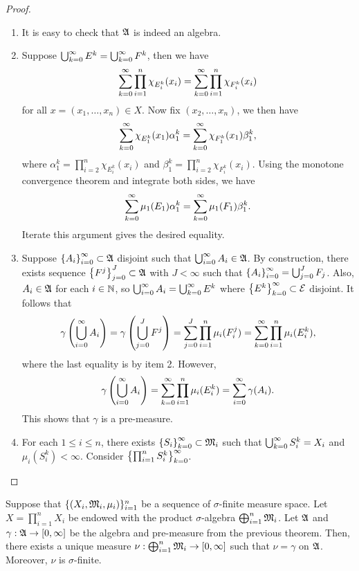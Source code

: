 \documentclass[a4paper]{article}
\begin{document}
\begin{proof}
\begin{enumerate}
\item It is easy to check that $\mathfrak{A}$ is indeed an algebra.
\item Suppose $\bigcup_{k=0}^\infty E^k = \bigcup_{k=0}^\infty F^k$, then we have 
\[
\sum_{k=0}^\infty \prod_{i=1}^n \chi_{E_i^k}(x_i) 
= \sum_{k=0}^\infty \prod_{i=1}^n \chi_{F_i^k}(x_i)
\]
for all $x = (x_1, \dots, x_n) \in X$. 
Now fix $(x_2, \dots, x_n)$, we then have 
\[
\sum_{k=0}^\infty \chi_{E^k_1}(x_1) \alpha_1^k 
= \sum_{k=0}^\infty \chi_{F^k_1}(x_1) \beta_1^k, 
\]
where 
$\alpha_1^k = \prod_{i=2}^n \chi_{E_i^k} (x_i)$ and 
$\beta_1^k = \prod_{i=2}^n \chi_{F_i^k} (x_i)$.
Using the monotone convergence theorem and integrate 
both sides, we have 
\[
\sum_{k=0}^\infty \mu_1(E_1) \alpha_1^k 
= \sum_{k=0}^\infty \mu_1(F_1) \beta_1^k.
\]
Iterate this argument gives the desired equality.

\item Suppose $\left\{ A_i \right\}_{i=0}^\infty \subset \mathfrak{A}$ disjoint such that 
$\bigcup_{i=0}^\infty A_i \in \mathfrak{A}$. By construction, there exists 
sequence $\left\{ F^j \right\}_{j=0}^J \subset \mathfrak{A}$ with $J < \infty$ such that 
$\left\{ A_i \right\}_{i=0}^\infty = \bigcup_{j=0}^J F_j$. Also, $A_i \in \mathfrak{A}$ 
for each $i \in \mathbb{N}$, so $\bigcup_{i=0}^\infty A_i = \bigcup_{k=0}^\infty E^k$
where $\left\{ E^k \right\}_{k=0}^\infty \subset \mathcal{E}$ disjoint.
It follows that 
\[
\gamma \left( \bigcup_{i=0}^\infty A_i \right)
= \gamma \left( \bigcup_{j=0}^J F^j \right)
= \sum_{j=0}^J \prod_{i=1}^n \mu_i ( F_i^j )
= \sum_{k=0}^\infty \prod_{i=1}^n \mu_i (E_i^k),
\]
where the last equality is by item 2. However, 
\[
\gamma \left( \bigcup_{i=0}^\infty A_i \right) 
= \sum_{k=0}^\infty \prod_{i=1}^n \mu_i (E_i^k) 
= \sum_{i=0}^\infty \gamma (A_i).
\]
This shows that $\gamma$ is a pre-measure.

\item For each $1 \leq i \leq n$, there exists 
$\left\{ S_i \right\}_{k=0}^\infty \subset \mathfrak{M}_i$ such that 
$\bigcup_{k=0}^\infty S_i^k = X_i$ and $\mu_i(S_i^k) < \infty$.
Consider $\left\{ \prod_{i=1}^n S_i^k \right\}_{k=0}^\infty$.

\end{enumerate}
\end{proof}

\begin{cor}
Suppose that $\{(X_i, \mathfrak{M}_i, \mu_i)\}_{i=1}^n$ be 
a sequence of $\sigma$-finite measure space. 
Let $X = \prod_{i=1}^n X_i$ be endowed with the product 
$\sigma$-algebra $\bigoplus_{i=1}^n \mathfrak{M}_i$. Let $\mathfrak{A}$
and $\gamma: \mathfrak{A} \to [0, \infty]$ be the algebra and 
pre-measure from the previous theorem. Then, there 
exists a unique measure $\nu: \bigoplus_{i=1}^n \mathfrak{M}_i
\to [0, \infty]$ such that $\nu = \gamma$ on $\mathfrak{A}$.
Moreover, $\nu$ is $\sigma$-finite.
\end{cor}
\end{document}

